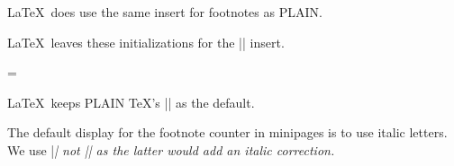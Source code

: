 %
%
%
%
%
 \begin{macro}{\footins}
 \LaTeX\ does use the same insert for footnotes as PLAIN.
    \begin{teX}
\newinsert\footins
    \end{teX}

 \LaTeX\ leaves these initializations for the |\footins| insert.

    \begin{teX}
\skip\footins=\bigskipamount %
\count{} %
\dimen\footins=8in %
    \end{teX}
 \end{macro}


 \begin{macro}{\footnoterule}
 \LaTeX\ keeps PLAIN \TeX's |\footnoterule| as the default.

    \begin{teX}
\def\footnoterule{\kern-3\p@
  \hrule \@width 2in \kern 2.6\p@} %
    \end{teX}
 \end{macro}

 \begin{macro}{\thefootnote}
    \begin{teX}
\def\thefootnote{\@arabic\c@footnote}
    \end{teX}
 \end{macro}

 \begin{macro}{\thempfootnote}
    The default display for the footnote counter in minipages is to
    use italic letters. We use |\itshape| not |\textit| as the latter
    would add an italic correction.
    \begin{teX}
\def\thempfootnote{{\itshape\@alph\c@mpfootnote}}
    \end{teX}
 \end{macro}

